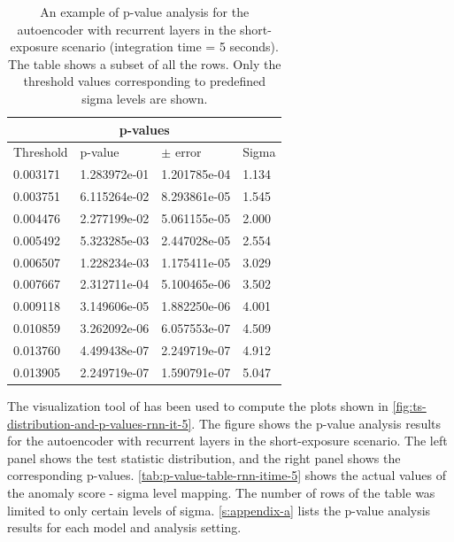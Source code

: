 \begin{table}[!htb]
\centering
\begin{tabular}{|p{3cm}|p{3cm}|p{3cm}|p{3cm}|}
\hline
\multicolumn{4}{|c|}{p-values} \\
\hline
Threshold & p-value & $\pm$ error &  Sigma \\
\hline
0.003171 &  1.283972e-01 &  1.201785e-04 &  1.134 \\
0.003751 &  6.115264e-02 &  8.293861e-05 &  1.545 \\
0.004476 &  2.277199e-02 &  5.061155e-05 &  2.000 \\
0.005492 &  5.323285e-03 &  2.447028e-05 &  2.554 \\
0.006507 &  1.228234e-03 &  1.175411e-05 &  3.029 \\
0.007667 &  2.312711e-04 &  5.100465e-06 &  3.502 \\
0.009118 &  3.149606e-05 &  1.882250e-06 &  4.001 \\
0.010859 &  3.262092e-06 &  6.057553e-07 &  4.509 \\
0.013760 &  4.499438e-07 &  2.249719e-07 &  4.912 \\
0.013905 &  2.249719e-07 &  1.590791e-07 &  5.047 \\
\hline
\end{tabular}
\caption{An example of p-value analysis for the autoencoder with recurrent layers in the short-exposure scenario (integration time = 5 seconds). The table shows a subset of all the rows. Only the threshold values corresponding to predefined sigma levels are shown.}
\label{tab:p-value-table-rnn-itime-5}
\end{table}
The visualization tool of \cite{dipiano2022ctasagsci} has been used to compute the plots shown in \autoref{fig:ts-distribution-and-p-values-rnn-it-5}. The figure shows the p-value analysis results for the autoencoder with recurrent layers in the short-exposure scenario. The left panel  shows the test statistic distribution, and the right panel shows the corresponding p-values. \autoref{tab:p-value-table-rnn-itime-5} shows the actual values of the anomaly score - sigma level mapping. The number of rows of the table was limited to only certain levels of sigma. \autoref{s:appendix-a} lists the p-value analysis results for each model and analysis setting. 

 


